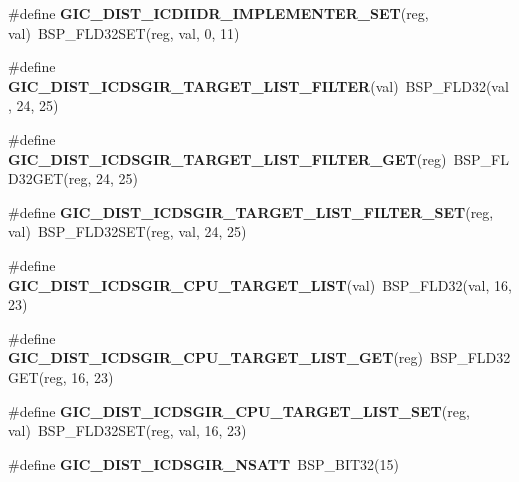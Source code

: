 \begin{DoxyCompactItemize}
\#define {\bfseries G\+I\+C\+\_\+\+D\+I\+S\+T\+\_\+\+I\+C\+D\+I\+I\+D\+R\+\_\+\+I\+M\+P\+L\+E\+M\+E\+N\+T\+E\+R\+\_\+\+S\+ET}(reg,  val)~B\+S\+P\+\_\+\+F\+L\+D32\+S\+ET(reg, val, 0, 11)
\item 
\mbox{\label{arm-gic-regs_8h_af5b07c099eb9cfaa3d26b8239a36e5c3}} 
\#define {\bfseries G\+I\+C\+\_\+\+D\+I\+S\+T\+\_\+\+I\+C\+D\+S\+G\+I\+R\+\_\+\+T\+A\+R\+G\+E\+T\+\_\+\+L\+I\+S\+T\+\_\+\+F\+I\+L\+T\+ER}(val)~B\+S\+P\+\_\+\+F\+L\+D32(val, 24, 25)
\item 
\mbox{\label{arm-gic-regs_8h_ae4a0588723bb1639e39affb3d4e55432}} 
\#define {\bfseries G\+I\+C\+\_\+\+D\+I\+S\+T\+\_\+\+I\+C\+D\+S\+G\+I\+R\+\_\+\+T\+A\+R\+G\+E\+T\+\_\+\+L\+I\+S\+T\+\_\+\+F\+I\+L\+T\+E\+R\+\_\+\+G\+ET}(reg)~B\+S\+P\+\_\+\+F\+L\+D32\+G\+ET(reg, 24, 25)
\item 
\mbox{\label{arm-gic-regs_8h_a77a780c1f7c7c70ba5c8f21f906a9295}} 
\#define {\bfseries G\+I\+C\+\_\+\+D\+I\+S\+T\+\_\+\+I\+C\+D\+S\+G\+I\+R\+\_\+\+T\+A\+R\+G\+E\+T\+\_\+\+L\+I\+S\+T\+\_\+\+F\+I\+L\+T\+E\+R\+\_\+\+S\+ET}(reg,  val)~B\+S\+P\+\_\+\+F\+L\+D32\+S\+ET(reg, val, 24, 25)
\item 
\mbox{\label{arm-gic-regs_8h_ab0005e5ed07e53bc7f8c3bc3c873ca0e}} 
\#define {\bfseries G\+I\+C\+\_\+\+D\+I\+S\+T\+\_\+\+I\+C\+D\+S\+G\+I\+R\+\_\+\+C\+P\+U\+\_\+\+T\+A\+R\+G\+E\+T\+\_\+\+L\+I\+ST}(val)~B\+S\+P\+\_\+\+F\+L\+D32(val, 16, 23)
\item 
\mbox{\label{arm-gic-regs_8h_a0412dcbf9b670a4e05be5cee11bff85e}} 
\#define {\bfseries G\+I\+C\+\_\+\+D\+I\+S\+T\+\_\+\+I\+C\+D\+S\+G\+I\+R\+\_\+\+C\+P\+U\+\_\+\+T\+A\+R\+G\+E\+T\+\_\+\+L\+I\+S\+T\+\_\+\+G\+ET}(reg)~B\+S\+P\+\_\+\+F\+L\+D32\+G\+ET(reg, 16, 23)
\item 
\mbox{\label{arm-gic-regs_8h_a7f7357709fe9efc875acae581d228679}} 
\#define {\bfseries G\+I\+C\+\_\+\+D\+I\+S\+T\+\_\+\+I\+C\+D\+S\+G\+I\+R\+\_\+\+C\+P\+U\+\_\+\+T\+A\+R\+G\+E\+T\+\_\+\+L\+I\+S\+T\+\_\+\+S\+ET}(reg,  val)~B\+S\+P\+\_\+\+F\+L\+D32\+S\+ET(reg, val, 16, 23)
\item 
\mbox{\label{arm-gic-regs_8h_af8fe25cd70bdd9a3a93a824510581dd8}} 
\#define {\bfseries G\+I\+C\+\_\+\+D\+I\+S\+T\+\_\+\+I\+C\+D\+S\+G\+I\+R\+\_\+\+N\+S\+A\+TT}~B\+S\+P\+\_\+\+B\+I\+T32(15)

\end{DoxyCompactItemize}
